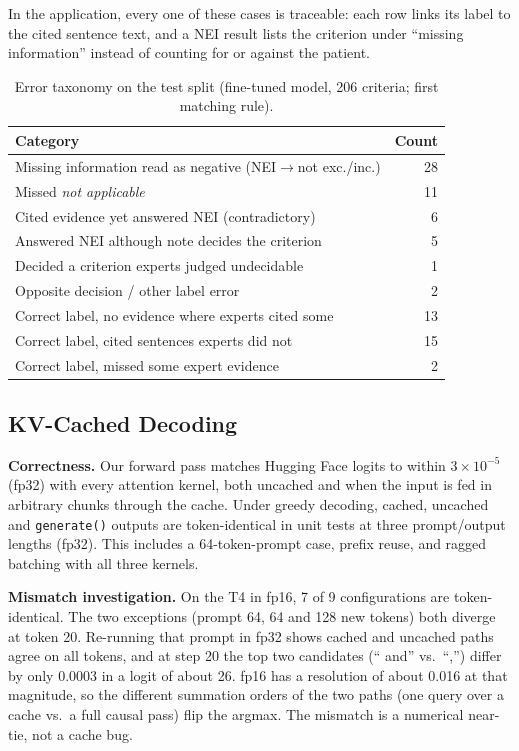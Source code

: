 \documentclass[conference]{IEEEtran}
\newcommand{\code}[1]{\texttt{\small #1}}
\begin{document}
In the application, every one of these cases is traceable: each row links its label to the cited sentence text, and a NEI result lists the criterion under ``missing information'' instead of counting for or against the patient.

\begin{table}[t]
\caption{Error taxonomy on the test split (fine-tuned model, 206 criteria; first matching rule).}
\label{tab:errors}
\centering\footnotesize
\begin{tabular}{@{}lr@{}}
\toprule
Category & Count\\
\midrule
Missing information read as negative (NEI$\rightarrow$not exc./inc.) & 28\\
Missed \emph{not applicable} & 11\\
Cited evidence yet answered NEI (contradictory) & 6\\
Answered NEI although note decides the criterion & 5\\
Decided a criterion experts judged undecidable & 1\\
Opposite decision / other label error & 2\\
\midrule
Correct label, no evidence where experts cited some & 13\\
Correct label, cited sentences experts did not & 15\\
Correct label, missed some expert evidence & 2\\
\bottomrule
\end{tabular}
\end{table}

\subsection{KV-Cached Decoding}
\textbf{Correctness.} Our forward pass matches Hugging Face logits to within $3\times10^{-5}$ (fp32) with every attention kernel, both uncached and when the input is fed in arbitrary chunks through the cache. Under greedy decoding, cached, uncached and \code{generate()} outputs are token-identical in unit tests at three prompt/output lengths (fp32). This includes a 64-token-prompt case, prefix reuse, and ragged batching with all three kernels.

\textbf{Mismatch investigation.} On the T4 in fp16, 7 of 9 configurations are token-identical. The two exceptions (prompt 64, 64 and 128 new tokens) both diverge at token 20. Re-running that prompt in fp32 shows cached and uncached paths agree on all tokens, and at step 20 the top two candidates (`` and'' vs.\ ``,'') differ by only 0.0003 in a logit of about 26. fp16 has a resolution of about 0.016 at that magnitude, so the different summation orders of the two paths (one query over a cache vs.\ a full causal pass) flip the argmax. The mismatch is a numerical near-tie, not a cache bug.
\end{document}
